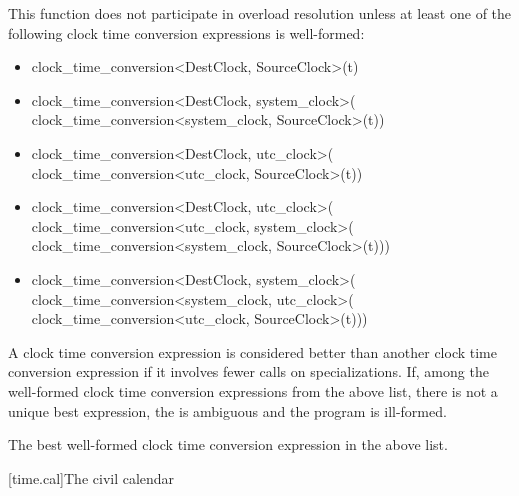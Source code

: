 \begin{itemdescr}
\pnum
\remarks
This function does not participate in overload resolution unless
at least one of the following clock time conversion expressions
is well-formed:
\begin{itemize}
\item
\begin{codeblock}
clock_time_conversion<DestClock, SourceClock>{}(t)
\end{codeblock}

\item
\begin{codeblock}
clock_time_conversion<DestClock, system_clock>{}(
    clock_time_conversion<system_clock, SourceClock>{}(t))
\end{codeblock}

\item
\begin{codeblock}
clock_time_conversion<DestClock, utc_clock>{}(
    clock_time_conversion<utc_clock, SourceClock>{}(t))
\end{codeblock}

\item
\begin{codeblock}
clock_time_conversion<DestClock, utc_clock>{}(
    clock_time_conversion<utc_clock, system_clock>{}(
        clock_time_conversion<system_clock, SourceClock>{}(t)))
\end{codeblock}

\item
\begin{codeblock}
clock_time_conversion<DestClock, system_clock>{}(
    clock_time_conversion<system_clock, utc_clock>{}(
        clock_time_conversion<utc_clock, SourceClock>{}(t)))
\end{codeblock}
\end{itemize}

A clock time conversion expression is considered better than
another clock time conversion expression if it involves fewer
 calls on 
specializations.
If, among the well-formed clock time conversion expressions
from the above list, there is not a unique best expression,
the  is ambiguous and the program is ill-formed.

\pnum
\returns
The best well-formed clock time conversion expression in the above list.
\end{itemdescr}

[time.cal]{The civil calendar}

